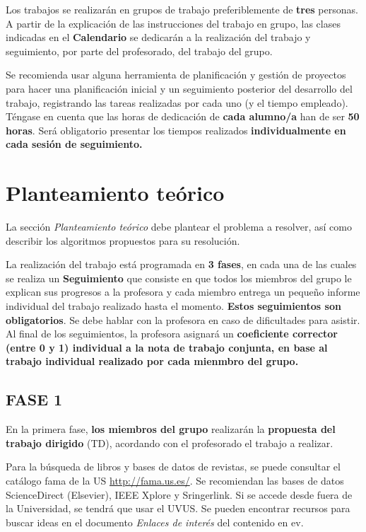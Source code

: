 \documentclass[a4paper]{article}
\begin{document}
Los trabajos se realizarán en grupos de trabajo preferiblemente de {\bf tres} personas.  A partir de la explicación de las instrucciones del trabajo en grupo, las clases indicadas en el {\bf Calendario} se dedicarán a la realización del trabajo y seguimiento, por parte del profesorado, del trabajo del grupo. 

Se recomienda usar alguna herramienta de planificación y gestión de proyectos para hacer una planificación inicial y un seguimiento posterior del desarrollo del trabajo, registrando las tareas realizadas por cada uno (y el tiempo empleado). Téngase en cuenta que las horas de dedicación de \textbf{cada alumno/a} han de ser \textbf{50 horas}. Será obligatorio presentar los tiempos realizados {\bf individualmente en cada sesión de seguimiento.}

\section{Planteamiento teórico}

La sección \textit{Planteamiento teórico} debe plantear el problema a resolver, así como describir los algoritmos propuestos para su resolución. 

La realización del trabajo está programada en {\bf 3 fases}, en cada una de las cuales se realiza un {\bf Seguimiento} que consiste en que todos los miembros del grupo le explican sus progresos a la profesora y cada miembro entrega un pequeño informe individual del trabajo realizado hasta el momento. {\bf Estos seguimientos son obligatorios}. Se debe hablar con la profesora en caso de dificultades para asistir. Al final de los seguimientos, la profesora asignará un {\bf coeficiente corrector (entre 0 y 1) individual a la nota de trabajo conjunta, en base al trabajo individual realizado por cada mienmbro del grupo. }
\subsection*{FASE 1}
En la primera fase, \textbf{los miembros del grupo} realizarán la \textbf{propuesta del trabajo dirigido} (TD), acordando con el profesorado el trabajo a realizar. 

Para la búsqueda de libros y bases de datos de revistas, se puede consultar el catálogo fama de la US \url{http://fama.us.es/}. Se recomiendan las bases de datos ScienceDirect (Elsevier), IEEE Xplore y Sringerlink. Si se accede desde fuera de la Universidad, se tendrá que usar el UVUS. Se pueden encontrar recursos para buscar ideas en el documento \textit{Enlaces de interés} del contenido en ev.
\end{document}
